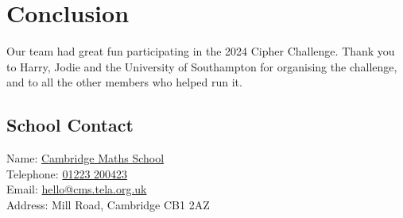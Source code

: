 \section*{Conclusion}

Our team had great fun participating in the 2024 Cipher Challenge. Thank you to Harry, Jodie and the University of Southampton for organising the challenge, and to all the other members who helped run it.

\subsection*{School Contact}

\begin{tabbing}
Name: \hspace{2cm} \= \href{https://cms.tela.org.uk}{Cambridge Maths School} \\
Telephone: \> \href{tel:+441223200423}{01223 200423} \\
Email: \> \href{mailto:hello@cms.tela.org.uk}{hello@cms.tela.org.uk} \\
Address:  Mill Road, Cambridge CB1 2AZ
\end{tabbing}
